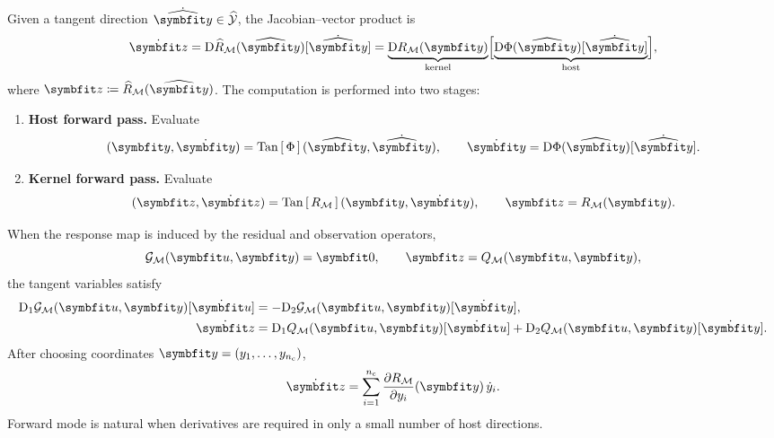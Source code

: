 Given a tangent direction \(\dot{\HostParameters}\in \HostSpace\), the Jacobian--vector product is
\begin{equation}
\label{eq:jvp-composed}
\dot{\bm z}
=
\D \ComposedResponse_{\ModelFamily}(\HostParameters)[\dot{\HostParameters}]
=
\underbrace{\D \ResponseMap_{\ModelFamily}(\CoreParameters)}_{\text{kernel}}
\Bigl[
\underbrace{\D \ParameterMap(\HostParameters)[\dot{\HostParameters}]}_{\text{host}}
\Bigr],
\end{equation}
where \(\bm z \coloneq \ComposedResponse_{\ModelFamily}(\HostParameters)\). 
The computation is performed into two stages:
\begin{enumerate}
    \item \textbf{Host forward pass.} Evaluate
    \[
    (\CoreParameters,\dot{\CoreParameters})
    =
    \Tan{\ParameterMap}(\HostParameters,\dot{\HostParameters}),
    \qquad
    \dot{\CoreParameters}
    =
    \D \ParameterMap(\HostParameters)[\dot{\HostParameters}].
    \]

    \item \textbf{Kernel forward pass.} Evaluate
    \[
    (\bm z,\dot{\bm z})
    =
    \Tan{\ResponseMap_{\ModelFamily}}(\CoreParameters,\dot{\CoreParameters}),
    \qquad
    \bm z=\ResponseMap_{\ModelFamily}(\CoreParameters).
    \]
\end{enumerate}

When the response map is induced by the residual and observation operators,
\[
\Residual_{\ModelFamily}(\State,\CoreParameters)=\bm 0,
\qquad
\bm z=\Observation_{\ModelFamily}(\State,\CoreParameters),
\]
the tangent variables satisfy
\begin{align}
\label{eq:forward-linearized-equilibrium}
\D_1 \Residual_{\ModelFamily}(\State,\CoreParameters)[\dot{\State}]
&=
-
\D_2 \Residual_{\ModelFamily}(\State,\CoreParameters)[\dot{\CoreParameters}],
\\
\label{eq:forward-response-variation}
\dot{\bm z}
&=
\D_1 \Observation_{\ModelFamily}(\State,\CoreParameters)[\dot{\State}]
+
\D_2 \Observation_{\ModelFamily}(\State,\CoreParameters)[\dot{\CoreParameters}].
\end{align}
After choosing coordinates \(\CoreParameters=(y_1,\ldots,y_{n_{\mathrm c}})\),
\begin{equation}
\label{eq:jvp-contraction}
\dot{\bm z}
=
\sum_{i=1}^{n_{\mathrm c}}
\frac{\partial \ResponseMap_{\ModelFamily}}{\partial y_i}(\CoreParameters)\,\dot y_i.
\end{equation}
Forward mode is natural when derivatives are required in only a small number of host directions.

